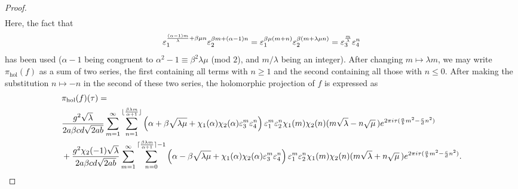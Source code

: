 \documentclass[11pt,reqno]{amsart}
\renewcommand{\=}{\;=\;}
\theoremstyle{myremark}
\begin{document}
\begin{proof}
{\begin{align*}
\end{align*}
}
Here, the fact that
\[ \varepsilon_1^{{(\alpha-1) m \over \lambda}+\beta\mu n} \varepsilon_2^{\beta m + (\alpha-1) n} = \varepsilon_1^{\beta \mu(m+n)} \varepsilon_2^{\beta(m + \lambda \mu n)} = \varepsilon_3^{m \over \lambda} \varepsilon_4^n \]
has been used ($\alpha-1$ being congruent to $\alpha^2-1\equiv\beta^2\lambda\mu$ (mod $2$), and $m/\lambda$ being an integer). 
After changing $m \mapsto \lambda m$, we may write $\pi_\text{hol}(f)$ as a sum of two series, the first containing all terms with $n \geq 1$ and the second containing all those with $n \leq 0$. 
After making the substitution $n \mapsto -n$ in the second of these two series, the holomorphic projection of $f$ is expressed as
{\fontsize{9}{10}\selectfont
\begin{align}
&\pi_\text{hol}(f)(\tau) = \\
&{g^2\sqrt{\lambda} \over 2a\beta cd\sqrt{2ab}} \sum_{m=1}^\infty \sum_{n=1}^{\lfloor {\beta \lambda m \over \alpha+1} \rfloor} \left( \alpha + \beta \sqrt{\lambda\mu} + \chi_1(\alpha)\chi_2(\alpha) \varepsilon_3^m \varepsilon_4^n \right) \varepsilon_1^m \varepsilon_2^n \chi_1(m) \chi_2(n) (m\sqrt{\lambda} - n \sqrt{\mu} \,) e^{2\pi i \tau ({a \over b} m^2-{c \over d}n^2)} \nonumber \\
&+ {g^2 \chi_2(-1) \sqrt{\lambda} \over 2a\beta cd\sqrt{2ab}} \sum_{m=1}^\infty \sum_{n=0}^{\lceil {\beta \lambda m \over \alpha+1} \rceil-1} \left( \alpha - \beta \sqrt{\lambda\mu} + \chi_1(\alpha)\chi_2(\alpha) \varepsilon_3^m \varepsilon_4^n \right) \varepsilon_1^m \varepsilon_2^n  \chi_1(m) \chi_2(n) (m\sqrt{\lambda} + n \sqrt{\mu} \,) e^{2\pi i \tau ({a \over b} m^2-{c \over d}n^2)}. \label{eqn:hol_proj_rewritten}
\end{align}
}


\end{proof}
\end{document}
